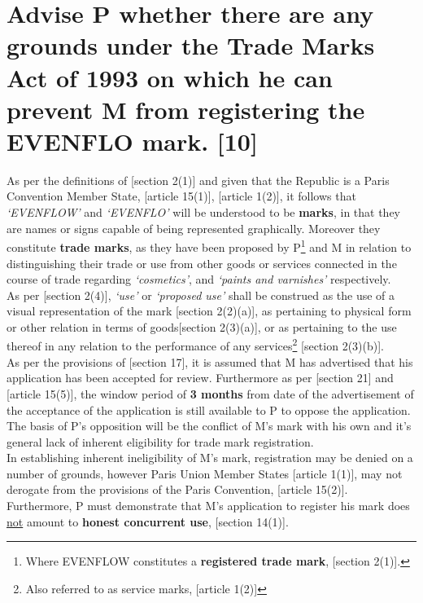 \documentclass[11pt]{article}
\begin{document}
\section{Advise P whether there are any grounds under the Trade Marks Act of 1993 on which he can prevent M from registering the EVENFLO mark. [10]}
\label{sec:org59414cd}
As per the definitions of [section 2(1)]\cite{rsa93_tm_act} and given that the Republic is a Paris Convention Member State, [article 15(1)]\cite{wto17_trips}, [article 1(2)]\cite{wipo83_paris_conve_protect_ip}, it follows that \emph{`EVENFLOW'} and \emph{`EVENFLO'} will be understood to be \textbf{marks}, in that they are names or signs capable of being represented graphically. Moreover they constitute \textbf{trade marks}, as they have been proposed by P\footnote{Where EVENFLOW constitutes a \textbf{registered trade mark}, [section 2(1)]\cite{rsa93_tm_act}.} and M in relation to distinguishing their trade or use from other goods or services connected in the course of trade regarding \emph{`cosmetics'}, and \emph{`paints and varnishes'} respectively.\\

As per [section 2(4)]\cite{rsa93_tm_act}, \emph{`use'} or \emph{`proposed use'} shall be construed as the use of a visual representation of the mark [section 2(2)(a)]\cite{rsa93_tm_act}, as pertaining to physical form or other relation in terms of goods[section 2(3)(a)]\cite{rsa93_tm_act}, or as pertaining to the use thereof in any relation to the performance of any services\footnote{Also referred to as service marks, [article 1(2)]\cite{wipo83_paris_conve_protect_ip}} [section 2(3)(b)]\cite{rsa93_tm_act}.\\

As per the provisions of [section 17]\cite{rsa93_tm_act}, it is assumed that M has advertised that his application has been accepted for review. Furthermore as per [section 21]\cite{rsa93_tm_act} and [article 15(5)]\cite{wto17_trips}, the window period of \textbf{3 months} from date of the advertisement of the acceptance of the application is still available to P to oppose the application. The basis of P's opposition will be the conflict of M's mark with his own and it's general lack of inherent eligibility for trade mark registration.\\

In establishing inherent ineligibility of M's mark, registration may be denied
on a number of grounds, however Paris Union Member States [article
1(1)]\cite{wipo83_paris_conve_protect_ip}, may not derogate from the provisions of
the Paris Convention, [article 15(2)]\cite{wto17_trips}. Furthermore, P must
demonstrate that M's application to register his mark does \uline{not} amount to \textbf{honest
concurrent use}, [section 14(1)]\cite{rsa93_tm_act}.\\
\end{document}
